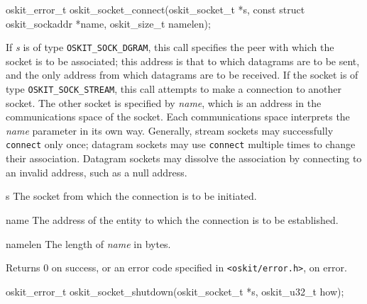 %
%

\begin{apisyn}

        \funcproto oskit_error_t
        oskit_socket_connect(oskit_socket_t *s,
		 const struct oskit_sockaddr *name,
		 oskit_size_t namelen);
\end{apisyn}

\begin{apidesc}
	If \emph{s} is of type \texttt{OSKIT_SOCK_DGRAM}, this call
	specifies the peer with which the socket is to be associated; this 
	address is that to which datagrams are to be sent, and the only address
	from which datagrams are to be received.  If the socket is of type
	\texttt{OSKIT_SOCK_STREAM}, this call attempts to make a connection 
	to another socket.
	The other socket is specified by \emph{name}, which is an address 
	in the communications space of the socket. 
	Each communications space interprets the \emph{name} parameter
	in its own way. Generally, stream sockets may successfully
	\texttt{connect} only once; datagram sockets may use 
	\texttt{connect} multiple times to change their association.  
	Datagram sockets may dissolve the association by connecting to 
	an invalid address, such as a null address.
\end{apidesc}

\begin{apiparm}
        \item[s]
                The socket from which the connection is to be initiated.

        \item[name]
                The address of the entity to which the connection is
		to be established. 

	\item[namelen]
		The length of \emph{name} in bytes.

\end{apiparm}

\begin{apiret}
        Returns 0 on success, or an error code specified in
        {\tt <oskit/error.h>}, on error.
\end{apiret}

%
%

\begin{apisyn}

        \funcproto oskit_error_t
        oskit_socket_shutdown(oskit_socket_t *s,
		 oskit_u32_t how);
\end{apisyn}

